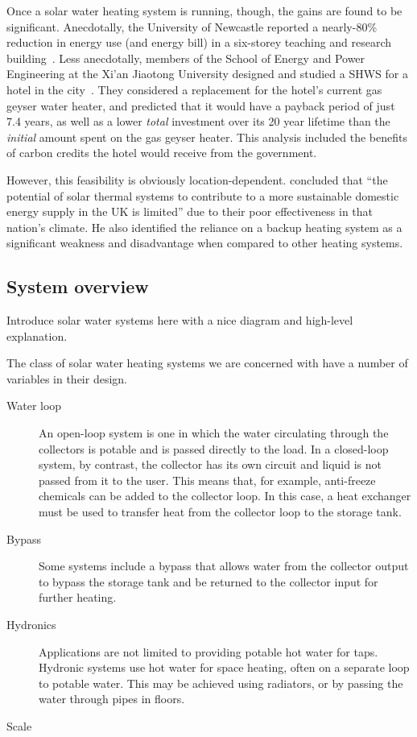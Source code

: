 Once a solar water heating system is running, though, the gains are found to be significant.
Anecdotally, the University of Newcastle reported a nearly-80\% reduction in energy use (and energy bill) in a six-storey teaching and research building~\cite{ApricusNewcastle}.
Less anecdotally, members of the School of Energy and Power Engineering at the Xi'an Jiaotong University designed and studied a SHWS for a hotel in the city~\cite{Cao14}.
They considered a replacement for the hotel's current gas geyser water heater, and predicted that it would have a payback period of just 7.4 years, as well as a lower \emph{total} investment over its 20 year lifetime than the \emph{initial} amount spent on the gas geyser heater.
This analysis included the benefits of carbon credits the hotel would receive from the government.

However, this feasibility is obviously location-dependent.
\textcite{Greening14} concluded that ``the potential of solar thermal systems to contribute to a more sustainable domestic energy supply in the UK is limited'' due to their poor effectiveness in that nation's climate.
He also identified the reliance on a backup heating system as a significant weakness and disadvantage when compared to other heating systems.

\subsection{System overview}
\label{sec:background:system}

Introduce solar water systems here with a nice diagram and high-level explanation.

The class of solar water heating systems we are concerned with have a number of variables in their design.

\begin{description}
   \item[Water loop] An open-loop system is one in which the water circulating through the collectors is potable and is passed directly to the load.
      In a closed-loop system, by contrast, the collector has its own circuit and liquid is not passed from it to the user.
      This means that, for example, anti-freeze chemicals can be added to the collector loop.
      In this case, a heat exchanger must be used to transfer heat from the collector loop to the storage tank.

   \item[Bypass] Some systems include a bypass  that allows water from the collector output to bypass the storage tank and be returned to the collector input for further heating.

   \item[Hydronics] Applications are not limited to providing potable hot water for taps.
      Hydronic systems use hot water for space heating, often on a separate loop to potable water.
      This may be achieved using radiators, or by passing the water through pipes in floors.

   \item[Scale] 
\end{description}

